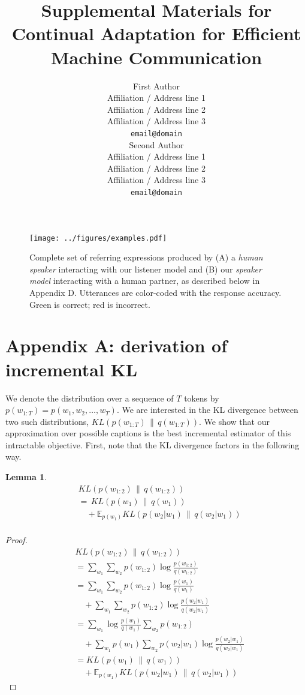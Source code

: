 \documentclass[11pt,a4paper]{article}
\title{Supplemental Materials for \\ Continual Adaptation for Efficient Machine Communication}
\author{First Author \\
  Affiliation / Address line 1 \\
  Affiliation / Address line 2 \\
  Affiliation / Address line 3 \\
  \texttt{email@domain} \\\And
  Second Author \\
  Affiliation / Address line 1 \\
  Affiliation / Address line 2 \\
  Affiliation / Address line 3 \\
  \texttt{email@domain} \\}
\date{}
\newcommand{\KL}[2]{\ensuremath{KL\left({#1}\, \| \, {#2}\right)}}
\newtheorem{lemma}{Lemma}
\begin{document}
\maketitle

\begin{figure}
\centering
\texttt{[image: ../figures/examples.pdf]}
\caption{Complete set of referring expressions produced by (A) a \emph{human speaker} interacting with our listener model and (B) our \emph{speaker model} interacting with a human partner, as described below in Appendix D. Utterances are color-coded with the response accuracy. Green is correct; red is incorrect.}
\label{fig:examples}
\end{figure}

\section*{Appendix A: derivation of incremental KL}

We denote the distribution over a sequence of $T$ tokens by $p(w_{1:T}) = p(w_1, w_2, \dots, w_T)$.
We are interested in the KL divergence between two such distributions, $\KL{p(w_{1:T})}{q(w_{1:T})}$.
We show that our approximation over possible captions is the best incremental estimator of this intractable objective. 
First, note that the KL divergence factors in the following way.


\begin{lemma}
\begin{equation*}
\begin{split}
& \KL{p(w_{1:2})}{q(w_{1:2})}  \\
& = \, \KL{p(w_1)}{q(w_1)} \\
 & \quad + \mathbb{E}_{p(w_1)} \KL{p(w_2 | w_1)}{q(w_2 | w_1)}\\
 \end{split}
\end{equation*}
\end{lemma}
\begin{proof}
\phantom\qedhere
\begin{equation*}
\begin{split}
& \KL{p(w_{1:2})}{q(w_{1:2})} \\
& = \sum_{w_1}\sum_{w_2}p(w_{1:2})\log\frac{p(w_{1:2})}{q(w_{1:2})} \\
& =   \sum_{w_1}\sum_{w_2}p(w_{1:2})\log\frac{p(w_1)}{q(w_1)}  \\
 &\quad + \sum_{w_1}\sum_{w_2}p(w_{1:2})\log\frac{p(w_2|w_1)}{q(w_2|w_1)} \\
 & = \sum_{w_1}\log\frac{p(w_1)}{q(w_1)}\sum_{w_2}p(w_{1:2}) \\
 &\quad + \sum_{w_1}p(w_1)\sum_{w_2}p(w_2 | w_1)\log\frac{p(w_2|w_1)}{q(w_2|w_1)} \\
 & = \KL{p(w_1)}{q(w_1)} \\
 & \quad + \mathbb{E}_{p(w_1)} \KL{p(w_2 | w_1)}{q(w_2 | w_1)}
\end{split}
\end{equation*}
\end{proof}
\end{document}
